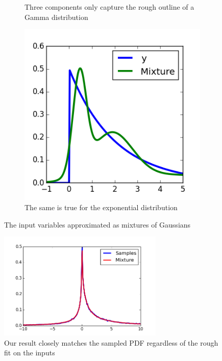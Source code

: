 \documentclass[11pt,a4paper]{book}
\begin{document}
\begin{figure}[h]
\begin{subfigure}[t]{0.3\textwidth}
    \caption{Three components only capture the rough outline of a Gamma
      distribution}
  \end{subfigure}
  \hfill
  \begin{subfigure}[t]{0.3\textwidth}
    \centering
    \includegraphics[width=\textwidth]{thesis/complex/introduction-var-y}
    \caption{The same is true for the exponential distribution}
  \end{subfigure}
  \caption{The input variables approximated as mixtures of Gaussians}
  \label{fig:introduction-vars}
\end{figure}
\begin{figure}[h]
  \centering
  \includegraphics[width=0.7\textwidth]{thesis/complex/introduction-result}
  \caption{Our result closely matches the sampled PDF regardless of the rough
    fit on the inputs}
  \label{fig:introduction-result}
\end{figure}
\end{document}
